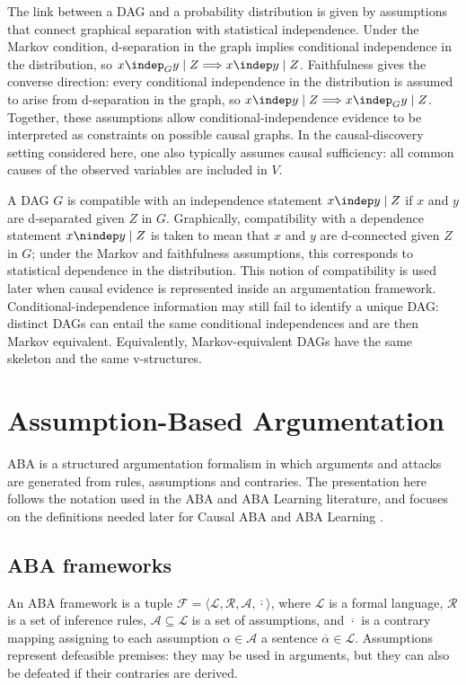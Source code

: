 The link between a DAG and a probability distribution is given by assumptions that connect graphical separation with statistical independence. Under the Markov condition, d-separation in the graph implies conditional independence in the distribution, so \(x \indep_G y \mid Z \Longrightarrow x \indep y \mid Z\). Faithfulness gives the converse direction: every conditional independence in the distribution is assumed to arise from d-separation in the graph, so \(x \indep y \mid Z \Longrightarrow x \indep_G y \mid Z\). Together, these assumptions allow conditional-independence evidence to be interpreted as constraints on possible causal graphs. In the causal-discovery setting considered here, one also typically assumes causal sufficiency: all common causes of the observed variables are included in \(V\).

A DAG \(G\) is compatible with an independence statement \(x \indep y \mid Z\) if \(x\) and \(y\) are d-separated given \(Z\) in \(G\). Graphically, compatibility with a dependence statement \(x \nindep y \mid Z\) is taken to mean that \(x\) and \(y\) are d-connected given \(Z\) in \(G\); under the Markov and faithfulness assumptions, this corresponds to statistical dependence in the distribution. This notion of compatibility is used later when causal evidence is represented inside an argumentation framework. Conditional-independence information may still fail to identify a unique DAG: distinct DAGs can entail the same conditional independences and are then Markov equivalent. Equivalently, Markov-equivalent DAGs have the same skeleton and the same v-structures.

\section{Assumption-Based Argumentation}

ABA is a structured argumentation formalism in which arguments and attacks are generated from rules, assumptions and contraries. The presentation here follows the notation used in the ABA and ABA Learning literature, and focuses on the definitions needed later for Causal ABA and ABA Learning \cite{bondarenko1997abstract,toni2014tutorial}.

\subsection{ABA frameworks}

An ABA framework is a tuple \(\mathcal{F} = \langle \mathcal{L}, \mathcal{R}, \mathcal{A}, \overline{\cdot} \rangle\), where \(\mathcal{L}\) is a formal language, \(\mathcal{R}\) is a set of inference rules, \(\mathcal{A} \subseteq \mathcal{L}\) is a set of assumptions, and \(\overline{\cdot}\) is a contrary mapping assigning to each assumption \(\alpha \in \mathcal{A}\) a sentence \(\overline{\alpha} \in \mathcal{L}\). Assumptions represent defeasible premises: they may be used in arguments, but they can also be defeated if their contraries are derived.


